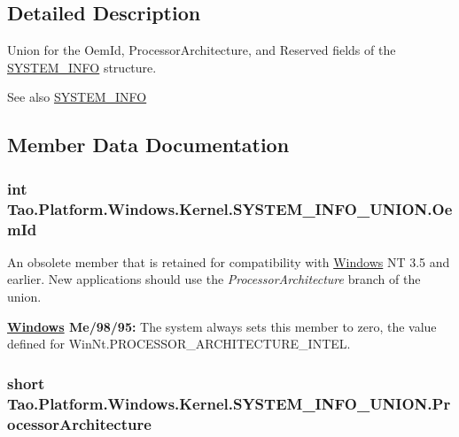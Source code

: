 \subsection{Detailed Description}
Union for the OemId, ProcessorArchitecture, and Reserved fields of the \hyperlink{struct_tao_1_1_platform_1_1_windows_1_1_kernel_1_1_s_y_s_t_e_m___i_n_f_o}{SYSTEM\_\-INFO} structure. \begin{DoxySeeAlso}{See also}
\hyperlink{struct_tao_1_1_platform_1_1_windows_1_1_kernel_1_1_s_y_s_t_e_m___i_n_f_o}{SYSTEM\_\-INFO}


\end{DoxySeeAlso}


\subsection{Member Data Documentation}
\hypertarget{struct_tao_1_1_platform_1_1_windows_1_1_kernel_1_1_s_y_s_t_e_m___i_n_f_o___u_n_i_o_n_afdbd9f4c92a56503a9b8fd4f0843c84a}{
\subsubsection[{OemId}]{\setlength{\rightskip}{0pt plus 5cm}int {\bf Tao.Platform.Windows.Kernel.SYSTEM\_\-INFO\_\-UNION.OemId}}}
\label{struct_tao_1_1_platform_1_1_windows_1_1_kernel_1_1_s_y_s_t_e_m___i_n_f_o___u_n_i_o_n_afdbd9f4c92a56503a9b8fd4f0843c84a}


An obsolete member that is retained for compatibility with \hyperlink{namespace_tao_1_1_platform_1_1_windows}{Windows} NT 3.5 and earlier. New applications should use the {\itshape ProcessorArchitecture\/} branch of the union. 

{\bfseries \hyperlink{namespace_tao_1_1_platform_1_1_windows}{Windows} Me/98/95:} The system always sets this member to zero, the value defined for WinNt.PROCESSOR\_\-ARCHITECTURE\_\-INTEL. 

\hypertarget{struct_tao_1_1_platform_1_1_windows_1_1_kernel_1_1_s_y_s_t_e_m___i_n_f_o___u_n_i_o_n_ab03cf53885bba407280234cb6e5059bb}{
\subsubsection[{ProcessorArchitecture}]{\setlength{\rightskip}{0pt plus 5cm}short {\bf Tao.Platform.Windows.Kernel.SYSTEM\_\-INFO\_\-UNION.ProcessorArchitecture}}}
\label{struct_tao_1_1_platform_1_1_windows_1_1_kernel_1_1_s_y_s_t_e_m___i_n_f_o___u_n_i_o_n_ab03cf53885bba407280234cb6e5059bb}


